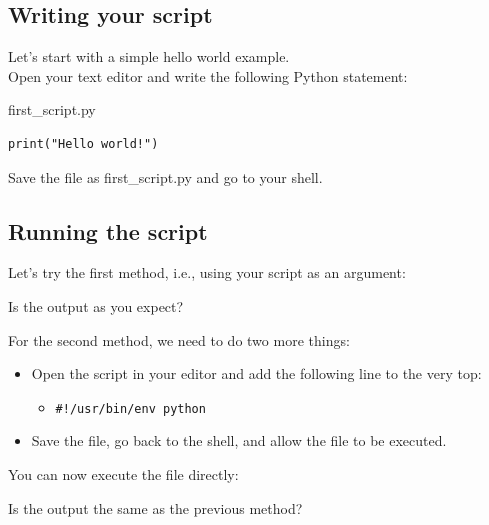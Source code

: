 \documentclass[aspectratio=1610,t]{beamer}
\begin{document}
\subsection{Writing your script}
\begin{pframe}
 Let's start with a simple hello world example.\\

 Open your text editor and write the following Python statement:

 \begin{pythonfile}{first\_script.py}
  \begin{verbatim}
print("Hello world!")
  \end{verbatim}
 \end{pythonfile}
Save the file as first\_script.py and go to your shell.
\end{pframe}

\subsection{Running the script}
\begin{pframe}
 Let's try the first method, i.e., using your script as an argument:
 \begin{terminal}
 \end{terminal}
  Is the output as you expect?
\end{pframe}

\begin{pframe}
  For the second method, we need to do two more things:
  \begin{itemize}
   \item Open the script in your editor and add the following line to the very
   top:
   \begin{itemize}
    \item \texttt{#!/usr/bin/env python}
   \end{itemize}
   \item Save the file, go back to the shell, and allow the file to be executed.
  \end{itemize}
 \begin{terminal}
 \end{terminal}
You can now execute the file directly:
\begin{terminal}
 \end{terminal}
 Is the output the same as the previous method?
\end{pframe}
\end{document}
